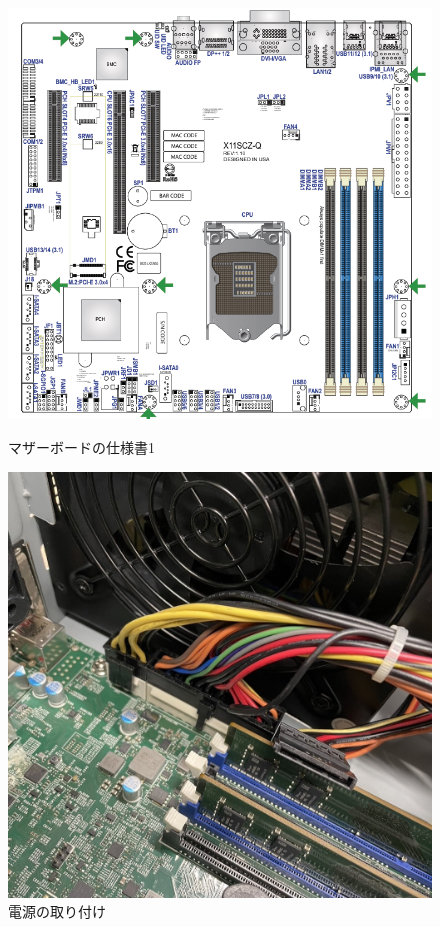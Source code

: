 \documentclass{ltjsarticle} %
\begin{document}
\begin{figure}[H] %
  \centering
  \begin{minipage}{0.45\textwidth} %
    \centering
    \includegraphics[width=\textwidth]{chart1.png} %
    \caption{マザーボードの仕様書1} %
    \label{fig:chart1} %
  \end{minipage}
  \hfill %
  \begin{minipage}{0.45\textwidth} %
    \centering
    \includegraphics[width=\textwidth]{mothertoritsuke.jpg} %
    \caption{電源の取り付け} %
    \label{fig:mothertoritsuke} %
  \end{minipage}
\end{figure}
\end{document}
